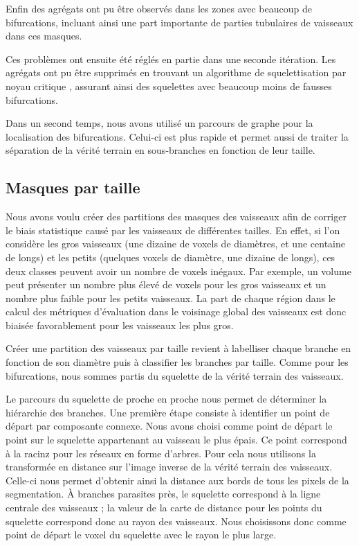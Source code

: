 Enfin des agrégats ont pu être observés dans les zones avec beaucoup de bifurcations, incluant ainsi une part importante de parties tubulaires de vaisseaux dans ces masques.

Ces problèmes ont ensuite été réglés en partie dans une seconde itération. Les agrégats ont pu être supprimés en trouvant un algorithme de squelettisation par noyau critique \cite{Bertrand2006_critical_kernel}, assurant ainsi des squelettes avec beaucoup moins de fausses bifurcations.

Dans un second temps, nous avons utilisé un parcours de graphe pour la localisation des bifurcations. Celui-ci est plus rapide et permet aussi de traiter la séparation de la vérité terrain en sous-branches en fonction de leur taille.

\subsection{Masques par taille}

Nous avons voulu créer des partitions des masques des vaisseaux afin de corriger le biais statistique causé par les vaisseaux de différentes tailles. En effet, si l'on considère les gros vaisseaux (une dizaine de voxels de diamètres, et une centaine de longs) et les petits (quelques voxels de diamètre, une dizaine de longs), ces deux classes peuvent avoir un nombre de voxels inégaux. Par exemple, un volume peut présenter un nombre plus élevé de voxels pour les gros vaisseaux et un nombre plus faible pour les petits vaisseaux. La part de chaque région dans le calcul des métriques d'évaluation dans le voisinage global des vaisseaux est donc biaisée favorablement pour les vaisseaux les plus gros.

Créer une partition des vaisseaux par taille revient à labelliser chaque branche en fonction de son diamètre puis à classifier les branches par taille. Comme pour les bifurcations, nous sommes partis du squelette de la vérité terrain des vaisseaux.

Le parcours du squelette de proche en proche nous permet de déterminer la hiérarchie des branches. Une première étape consiste à identifier un point de départ par composante connexe. Nous avons choisi comme point de départ le point sur le squelette appartenant au vaisseau le plus épais. Ce point correspond à la racinz pour les réseaux en forme d'arbres. Pour cela nous utilisons la transformée en distance sur l'image inverse de la vérité terrain des vaisseaux. Celle-ci nous permet d'obtenir ainsi la distance aux bords de tous les pixels de la segmentation. À branches parasites près, le squelette correspond à la ligne centrale des vaisseaux ; la valeur de la carte de distance pour les points du squelette correspond donc au rayon des vaisseaux. Nous choisissons donc comme point de départ le voxel du squelette avec le rayon le plus large.

